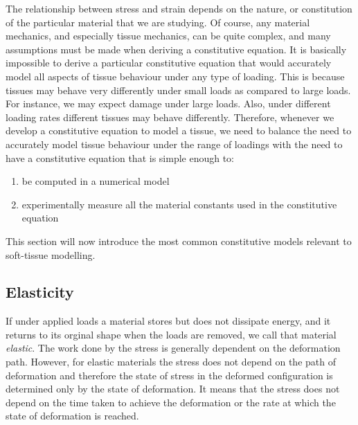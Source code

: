 The relationship between stress and strain depends on the nature, or constitution of the particular material that we are studying. Of course, any material mechanics, and especially tissue mechanics, can be quite complex, and many assumptions must be made when deriving a constitutive equation. It is basically impossible to derive a particular constitutive equation that would accurately model all aspects of tissue behaviour under any type of loading. This is because tissues may behave very differently under small loads as compared to large loads. For instance, we may expect damage under large loads. Also, under different loading rates different tissues may behave differently. Therefore, whenever we develop a constitutive equation to model a tissue, we need to balance the need to accurately model tissue behaviour under the range of loadings with the need to have a constitutive equation that is simple enough to:
\begin{enumerate}
\item be computed in a numerical model 
\item experimentally measure all the material constants used in the constitutive equation
\end{enumerate}
This section will now introduce the most common constitutive models relevant to soft-tissue modelling. 
    
    
	\subsection{Elasticity}	\label{chap2:elasticity}
If under applied loads a material stores but does not dissipate energy, and it returns to its orginal shape when the loads are removed, we call that material \emph{elastic}. The work done by the stress is generally dependent on the deformation path. However, for elastic materials the stress does not depend on the path of deformation and therefore the state of stress in the deformed configuration is determined only by the state of deformation. It means that the stress does not depend on the time taken to achieve the deformation or the rate at which the state of deformation is reached. 

